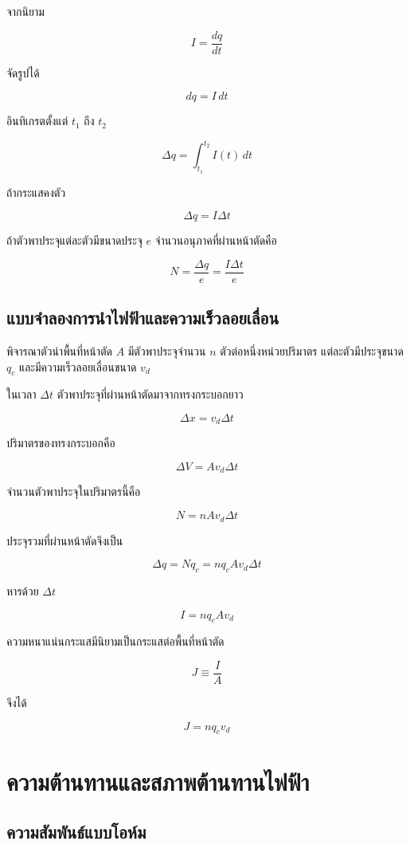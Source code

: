 จากนิยาม

\[
I=\frac{dq}{dt}
\]

จัดรูปได้

\[
dq=I\,dt
\]

อินทิเกรตตั้งแต่ $t_1$ ถึง $t_2$

\[
\Delta q=\int_{t_1}^{t_2}I(t)\,dt
\]

ถ้ากระแสคงตัว

\[
\boxed{\Delta q=I\Delta t}
\]

ถ้าตัวพาประจุแต่ละตัวมีขนาดประจุ $e$ จำนวนอนุภาคที่ผ่านหน้าตัดคือ

\[
N=\frac{\Delta q}{e}=\frac{I\Delta t}{e}
\]

\subsection{แบบจำลองการนำไฟฟ้าและความเร็วลอยเลื่อน}

พิจารณาตัวนำพื้นที่หน้าตัด $A$ มีตัวพาประจุจำนวน $n$ ตัวต่อหนึ่งหน่วยปริมาตร แต่ละตัวมีประจุขนาด $q_c$ และมีความเร็วลอยเลื่อนขนาด $v_d$

ในเวลา $\Delta t$ ตัวพาประจุที่ผ่านหน้าตัดมาจากทรงกระบอกยาว

\[
\Delta x=v_d\Delta t
\]

ปริมาตรของทรงกระบอกคือ

\[
\Delta V=A v_d\Delta t
\]

จำนวนตัวพาประจุในปริมาตรนี้คือ

\[
N=nAv_d\Delta t
\]

ประจุรวมที่ผ่านหน้าตัดจึงเป็น

\[
\Delta q=Nq_c=nq_cAv_d\Delta t
\]

หารด้วย $\Delta t$

\begin{tcolorbox}[title={กระแสจากแบบจำลองจุลภาค}]
\[
\boxed{I=nq_cAv_d}
\]
\end{tcolorbox}

ความหนาแน่นกระแสมีนิยามเป็นกระแสต่อพื้นที่หน้าตัด

\[
J\equiv\frac{I}{A}
\]

จึงได้

\[
\boxed{J=nq_cv_d}
\]

\section{ความต้านทานและสภาพต้านทานไฟฟ้า}

\subsection{ความสัมพันธ์แบบโอห์ม}

